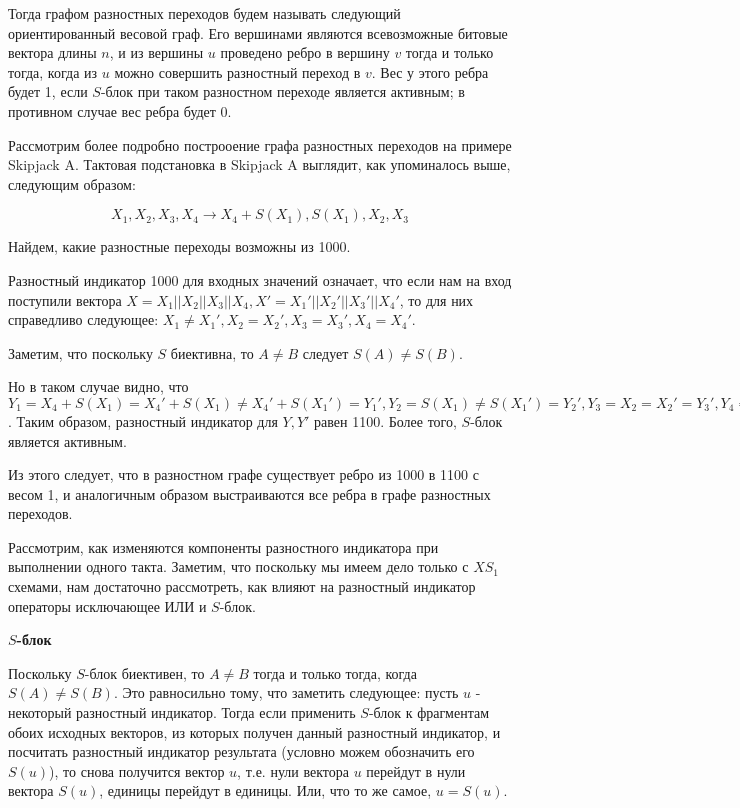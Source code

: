 \documentclass[a4paper,12pt]{report}
\theoremstyle{plain} %
\theoremstyle{definition}
\theoremstyle{remark}
\begin{document}
\begin{large}
Тогда графом разностных переходов будем называть следующий ориентированный весовой граф. Его вершинами являются всевозможные битовые вектора длины $n$, и из вершины $u$ проведено ребро в вершину $v$ тогда и только тогда, когда из $u$ можно совершить разностный переход в $v$. Вес у этого ребра будет 1, если $S$-блок при таком разностном переходе является активным; в противном случае вес ребра будет 0.

Рассмотрим более подробно построоение графа разностных переходов на примере Skipjack A. Тактовая подстановка в Skipjack A выглядит, как упоминалось выше, следующим образом:

$$X_1, X_2, X_3, X_4 \rightarrow X_4 + S(X_1), S(X_1), X_2, X_3$$

Найдем, какие разностные переходы возможны из 1000.

Разностный индикатор 1000 для входных значений означает, что если нам на вход поступили вектора $X=X_1||X_2||X_3||X_4, X'=X_1'||X_2'||X_3'||X_4'$, то для них справедливо следующее: $X_1\neq X_1', X_2=X_2', X_3 = X_3', X_4 = X_4'$. 

Заметим, что поскольку $S$ биективна, то $A \neq B$ следует $S(A) \neq S(B)$.

Но в таком случае видно, что $Y_1=X_4 + S(X_1)=X_4' + S(X_1)\neq X_4' + S(X_1')=Y_1', Y_2=S(X_1)\neq S(X_1')=Y_2', Y_3=X_2=X_2'=Y_3', Y_4=X_3= X_3'=Y_4'$. Таким образом, разностный индикатор для $Y, Y'$ равен 1100. Более того, $S$-блок является активным.

Из этого следует, что в разностном графе существует ребро из 1000 в 1100 с весом 1, и аналогичным образом выстраиваются все ребра в графе разностных переходов.

Рассмотрим, как изменяются компоненты разностного индикатора при выполнении одного такта. Заметим, что поскольку мы имеем дело только с $XS_1$ схемами, нам достаточно рассмотреть, как влияют на разностный индикатор операторы исключающее ИЛИ и $S$-блок.


\textbf{$S$-блок}

Поскольку $S$-блок биективен, то $A \neq B$ тогда и только тогда, когда $S(A) \neq S(B)$. Это равносильно тому, что заметить следующее: пусть $u$ - некоторый разностный индикатор. Тогда если применить $S$-блок к фрагментам обоих исходных векторов, из которых получен данный разностный индикатор, и посчитать разностный индикатор результата (условно можем обозначить его $S(u)$), то снова получится вектор $u$, т.е. нули вектора $u$ перейдут в нули вектора $S(u)$, единицы перейдут в единицы. Или, что то же самое, $u=S(u)$.


\end{large}
\end{document}
